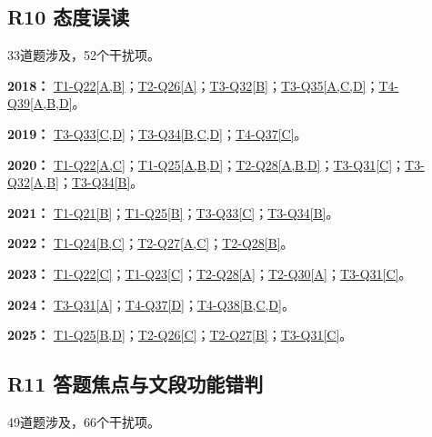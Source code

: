 \documentclass[11pt,a4paper]{article}
\begin{document}
\subsection{R10 态度误读}\label{class-R10}
33道题涉及，52个干扰项。

\noindent\textbf{2018：} \hyperref[idx-2018-T1-Q22]{T1-Q22[A,B]}；\hyperref[idx-2018-T2-Q26]{T2-Q26[A]}；\hyperref[idx-2018-T3-Q32]{T3-Q32[B]}；\hyperref[idx-2018-T3-Q35]{T3-Q35[A,C,D]}；\hyperref[idx-2018-T4-Q39]{T4-Q39[A,B,D]}。\par\smallskip
\noindent\textbf{2019：} \hyperref[idx-2019-T3-Q33]{T3-Q33[C,D]}；\hyperref[idx-2019-T3-Q34]{T3-Q34[B,C,D]}；\hyperref[idx-2019-T4-Q37]{T4-Q37[C]}。\par\smallskip
\noindent\textbf{2020：} \hyperref[idx-2020-T1-Q22]{T1-Q22[A,C]}；\hyperref[idx-2020-T1-Q25]{T1-Q25[A,B,D]}；\hyperref[idx-2020-T2-Q28]{T2-Q28[A,B,D]}；\hyperref[idx-2020-T3-Q31]{T3-Q31[C]}；\hyperref[idx-2020-T3-Q32]{T3-Q32[A,B]}；\hyperref[idx-2020-T3-Q34]{T3-Q34[B]}。\par\smallskip
\noindent\textbf{2021：} \hyperref[idx-2021-T1-Q21]{T1-Q21[B]}；\hyperref[idx-2021-T1-Q25]{T1-Q25[B]}；\hyperref[idx-2021-T3-Q33]{T3-Q33[C]}；\hyperref[idx-2021-T3-Q34]{T3-Q34[B]}。\par\smallskip
\noindent\textbf{2022：} \hyperref[idx-2022-T1-Q24]{T1-Q24[B,C]}；\hyperref[idx-2022-T2-Q27]{T2-Q27[A,C]}；\hyperref[idx-2022-T2-Q28]{T2-Q28[B]}。\par\smallskip
\noindent\textbf{2023：} \hyperref[idx-2023-T1-Q22]{T1-Q22[C]}；\hyperref[idx-2023-T1-Q23]{T1-Q23[C]}；\hyperref[idx-2023-T2-Q28]{T2-Q28[A]}；\hyperref[idx-2023-T2-Q30]{T2-Q30[A]}；\hyperref[idx-2023-T3-Q31]{T3-Q31[C]}。\par\smallskip
\noindent\textbf{2024：} \hyperref[idx-2024-T3-Q31]{T3-Q31[A]}；\hyperref[idx-2024-T4-Q37]{T4-Q37[D]}；\hyperref[idx-2024-T4-Q38]{T4-Q38[B,C,D]}。\par\smallskip
\noindent\textbf{2025：} \hyperref[idx-2025-T1-Q25]{T1-Q25[B,D]}；\hyperref[idx-2025-T2-Q26]{T2-Q26[C]}；\hyperref[idx-2025-T2-Q27]{T2-Q27[B]}；\hyperref[idx-2025-T3-Q31]{T3-Q31[C]}。\par\smallskip
{}
\subsection{R11 答题焦点与文段功能错判}\label{class-R11}
49道题涉及，66个干扰项。
\end{document}
